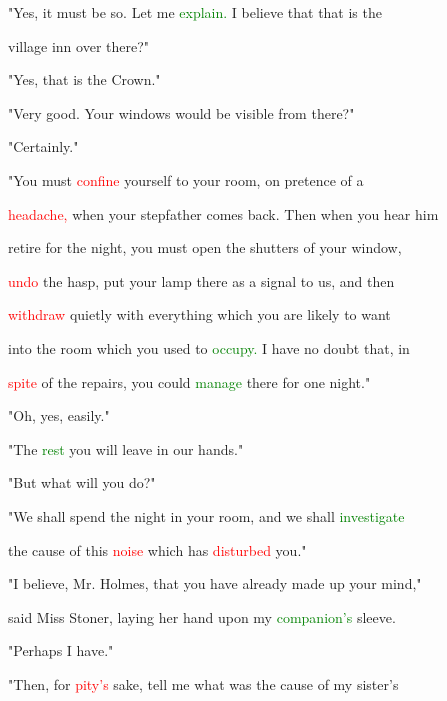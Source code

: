  "Yes, it must be so. Let me \textcolor{green}{explain.} I believe that that is the

 village inn over there?"



 "Yes, that is the Crown."



 "Very \textcolor{BurntOrange}{good.} Your windows would be visible from there?"



 "Certainly."



 "You must \textcolor{red}{confine} yourself to your room, on pretence of a

 \textcolor{red}{headache,} when your stepfather comes back. Then when you hear him

 retire for the night, you must open the shutters of your window,

 \textcolor{red}{undo} the hasp, put your lamp there as a signal to us, and then

 \textcolor{red}{withdraw} quietly with everything which you are likely to want

 into the room which you used to \textcolor{green}{occupy.} I have no \textcolor{BurntOrange}{doubt} that, in

 \textcolor{red}{spite} of the repairs, you could \textcolor{green}{manage} there for one night."



 "Oh, yes, easily."



 "The \textcolor{green}{rest} you will \textcolor{BurntOrange}{leave} in our hands."



 "But what will you do?"



 "We shall spend the night in your room, and we shall \textcolor{green}{investigate}

 the cause of this \textcolor{red}{noise} which has \textcolor{red}{disturbed} you."



 "I believe, Mr. Holmes, that you have already made up your mind,"

 said Miss Stoner, laying her hand upon my \textcolor{green}{companion's} sleeve.



 "Perhaps I have."



 "Then, for \textcolor{red}{pity's} sake, tell me what was the cause of my sister's

